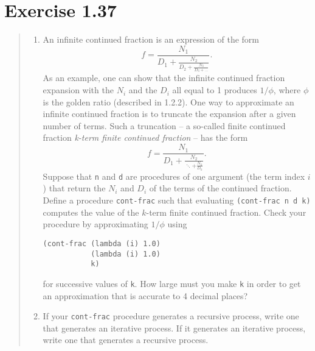 \documentclass{article}
\begin{document}
\section{Exercise 1.37}
\begin{quote}
    \begin{enumerate}
        \item An infinite continued fraction is an expression of the form
            \begin{equation*}
                f=\frac{N_1}{D_1+\frac{N_2}{D_2+\frac{N_3}{D_3+\ldots}}}.
            \end{equation*}
            As an example, one can show that the infinite continued fraction
            expansion with the $N_i$ and the $D_i$ all equal to 1 produces
            $1/\phi$, where $\phi$ is the golden ratio (described in 1.2.2).
            One way to approximate an infinite continued fraction is to
            truncate the expansion after a given number of terms. Such a
            truncation -- a so-called finite continued fraction
            \emph{k-term finite continued fraction} -- has the form
            \begin{equation*}
                f=\frac{N_1}{D_1+\frac{N_2}{\ddots+\frac{N_k}{D_k}}}.
            \end{equation*}
            Suppose that \texttt{n} and \texttt{d} are procedures of one
            argument (the term index $i$) that return the $N_i$ and $D_i$ of
            the terms of the continued fraction. Define a procedure
            \texttt{cont-frac} such that evaluating \texttt{(cont-frac n d k)}
            computes the value of the $k$-term finite continued fraction. Check
            your procedure by approximating $1/\phi$ using
            \begin{lstlisting}
(cont-frac (lambda (i) 1.0)
           (lambda (i) 1.0)
           k)
            \end{lstlisting}
            for successive values of \texttt{k}. How large must you make
            \texttt{k} in order to get an approximation that is accurate to 4
            decimal places?
        \item If your \texttt{cont-frac} procedure generates a recursive
            process, write one that generates an iterative process. If it
            generates an iterative process, write one that generates a
            recursive process.
    \end{enumerate}
\end{quote}
\end{document}
